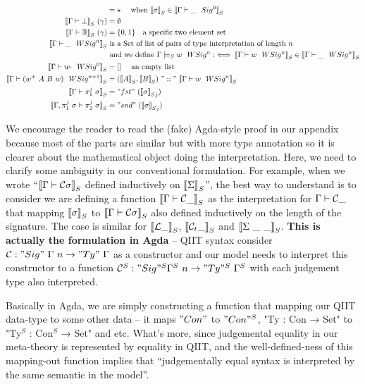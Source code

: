 \begin{align*}
  &= \star \quad \text{ when } \denotesS{\sigma} \in \denotesS{\goodSig{\Gamma}{\_}{0}} \\
  \denotesS{\goodType{\Gamma}{\bot}{i}} \ (\gamma) &= \emptyset \\
  \denotesS{\goodType{\Gamma}{\cB}{i}} \ (\gamma) &= \{0, 1\} \quad \text{a specific two element set} \\
  \denotesS{\goodWSig{\Gamma}{\_}{n}} &\text{ is a Set of list of pairs of type interpretation of length } n \\
  & \text{ and we define } \goodWSigS{\Gamma}{w}{n} :\iff \denotesS{\goodWSig{\Gamma}{w}{n}} \in \denotesS{\goodWSig{\Gamma}{\_}{n}}\\
  \denotesS{\goodWSig{\Gamma}{w\cdot}{0}} &= [] \quad \text{ an empty list} \\ 
  \denotesS{\goodWSig{\Gamma}{(w^+ \ A \ B \ w)}{n+1}}
  &= (\denotesS{A}, \denotesS{B})~"::"~\denotesS{\goodWSig{\Gamma}{w}{n}} \\ 
  \denotesS{\goodType{\Gamma}{\pi^j_1~\sigma}{}} &= "fst"~({\denotesS{\sigma}}_{j})\\
  \denotesS{\goodType{\Gamma, \pi^j_1~\sigma}{\pi^j_2~\sigma}{}} &= "snd"~({\denotesS{\sigma}}_j)\\
\end{align*}


We encourage the reader to read the (fake) Agda-style proof in our appendix because most of the parts are similar but with more type annotation so it is clearer about the mathematical object doing the interpretation. Here, we need to clarify some ambiguity in our conventional formulation. For example, when we wrote ``$\denotesS{\goodType{\Gamma}{\cC \sigma}{}}$ defined inductively on $\denotesS{\Sigma}$'', the best way to understand is to consider we are defining a function $\denotesS{\goodType{\Gamma}{\cC \_}{}}$ as the interpretation for $\goodType{\Gamma}{\cC \_}{}$ that mapping $\denotesS{\sigma}$ to $\denotesS{\goodType{\Gamma}{\cC \sigma}{}}$ also defined inductively on the length of the signature. The case is similar for $\denotesS{\cL \_}$, $\denotesS{\cCt \_}$ and  $\denotesS{\Sigma \ \_ \ \_}$. \textbf{This is actually the formulation in Agda} -- QIIT syntax consider $\cC : "Sig"~\Gamma~n \to "Ty"~\Gamma$ as a constructor and our model needs to interpret this constructor to a function $\cC^S : "Sig"^S \Gamma^S~n \to "Ty"^S~\Gamma^S$ with each judgement type also interpreted. 

Basically in Agda, we are simply constructing a function that mapping our QIIT data-type to some other data -- it maps $"Con"$ to $"Con"^S$, "Ty : Con → Set" to "Ty$^S$ : Con$^S$ → Set" and etc. What's more, since judgemental equality in our meta-theory is represented by equality in QIIT, and the well-defined-ness of this mapping-out function implies that ``judgementally equal syntax is interpreted by the same semantic in the model''. 


